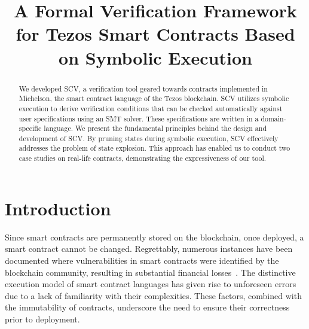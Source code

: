 \documentclass[runningheads]{llncs}
\begin{document}
%
\title{A Formal Verification Framework for Tezos Smart Contracts Based on Symbolic Execution}
%
%


%
%
%
\maketitle              %
%
\begin{abstract}
We developed SCV, a verification tool geared towards contracts implemented in Michelson, the smart contract language of the Tezos blockchain. SCV utilizes symbolic execution to derive verification conditions that can be checked automatically against user specifications using an SMT solver. These specifications are written in a domain-specific language. We present the fundamental principles behind the design and development of SCV. By pruning states during symbolic execution, SCV effectively addresses the problem of state explosion. This approach has enabled us to conduct two case studies on real-life contracts, demonstrating the expressiveness of our tool.
\end{abstract}
\section{Introduction}
\label{sec:introduction}
Since smart contracts are permanently stored on the blockchain, once deployed, a smart contract cannot be changed. Regrettably, numerous instances have been documented where vulnerabilities in smart contracts were identified by the blockchain community, resulting in substantial financial losses~\cite{dao,wallethack}. The distinctive execution model of smart contract languages has given rise to unforeseen errors due to a lack of familiarity with their complexities. These factors, combined with the immutability of contracts, underscore the need to ensure their correctness prior to deployment.
\end{document}
